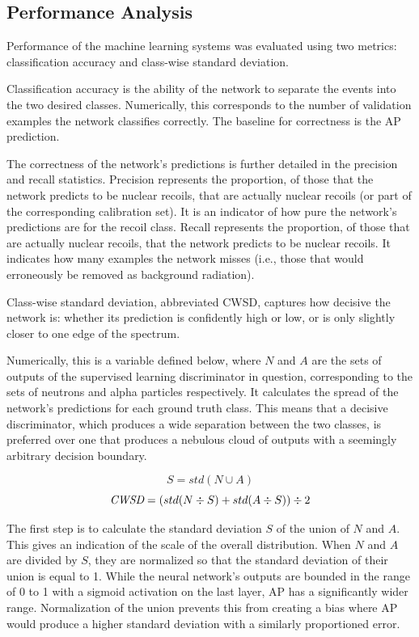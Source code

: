 \documentclass[10pt]{article}
\begin{document}
\subsection{Performance Analysis}

Performance of the machine learning systems was evaluated using two metrics: classification accuracy and class-wise standard deviation.

Classification accuracy is the ability of the network to separate the events into the two desired classes. Numerically, this corresponds to the number of validation examples the network classifies correctly. The baseline for correctness is the AP prediction.

The correctness of the network's predictions is further detailed in the precision and recall statistics. Precision represents the proportion, of those that the network predicts to be nuclear recoils, that are actually nuclear recoils (or part of the corresponding calibration set). It is an indicator of how pure the network's predictions are for the recoil class. Recall represents the proportion, of those that are actually nuclear recoils, that the network predicts to be nuclear recoils. It indicates how many examples the network misses (i.e., those that would erroneously be removed as background radiation).

Class-wise standard deviation, abbreviated CWSD, captures how decisive the network is: whether its prediction is confidently high or low, or is only slightly closer to one edge of the spectrum.

Numerically, this is a variable defined below, where $N$ and $A$ are the sets of outputs of the supervised learning discriminator in question, corresponding to the sets of neutrons and alpha particles respectively. It calculates the spread of the network's predictions for each ground truth class. This means that a decisive discriminator, which produces a wide separation between the two classes, is preferred over one that produces a nebulous cloud of outputs with a seemingly arbitrary decision boundary.

\begin{equation}
    S=std(N \cup A)
\end{equation}
\begin{equation}
    \mbox{\it CWSD}=(std(N \div S) + std(A \div S)) \div 2
\end{equation}

The first step is to calculate the standard deviation $S$ of the union of $N$ and $A$. This gives an indication of the scale of the overall distribution. When $N$ and $A$ are divided by $S$, they are normalized so that the standard deviation of their union is equal to 1. While the neural network's outputs are bounded in the range of 0 to 1 with a sigmoid activation on the last layer, AP has a significantly wider range. Normalization of the union prevents this from creating a bias where AP would produce a higher standard deviation with a similarly proportioned error.
\end{document}

